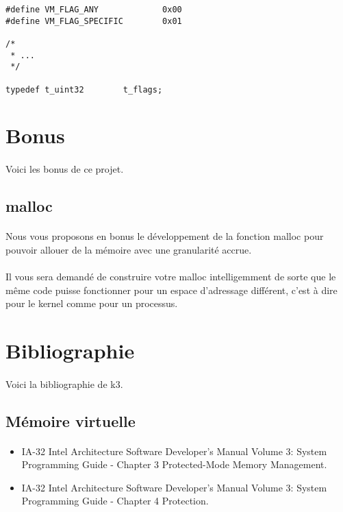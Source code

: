 \documentclass[10pt,a4wide]{article}
\begin{document}
\begin{verbatim}
#define VM_FLAG_ANY             0x00
#define VM_FLAG_SPECIFIC        0x01

/*
 * ...
 */

typedef t_uint32        t_flags;
\end{verbatim}

\section{Bonus}

\paragraph{}

Voici les bonus de ce projet.

\subsection{malloc}

\paragraph{}

Nous vous proposons en bonus le d\'eveloppement de la fonction malloc
pour pouvoir allouer de la m\'emoire avec une granularit\'e accrue.

\paragraph{}

Il vous sera demand\'e de construire votre malloc intelligemment de sorte
que le m\^eme code puisse fonctionner pour un espace d'adressage diff\'erent,
c'est \`a dire pour le kernel comme pour un processus.

\section{Bibliographie}

\paragraph{}

Voici la bibliographie de k3.

\subsection{M\'emoire virtuelle}

\paragraph{}

\begin{itemize}
\item IA-32 Intel Architecture Software Developer's Manual Volume 3:
      System Programming Guide - Chapter 3 Protected-Mode Memory Management.
\item IA-32 Intel Architecture Software Developer's Manual Volume 3:
      System Programming Guide - Chapter 4 Protection.
\end{itemize}
\end{document}
